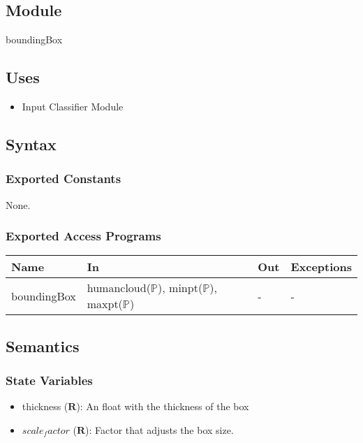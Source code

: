 \documentclass[12pt, titlepage]{article}
\begin{document}
\subsection{Module}

boundingBox

\subsection{Uses}

\begin{itemize}
  \item Input Classifier Module
\end{itemize}

\subsection{Syntax}

\subsubsection{Exported Constants}

None.

\subsubsection{Exported Access Programs}

\begin{center}
\begin{tabular}{p{2cm} p{4cm} p{2cm} p{2cm}}
\hline
\textbf{Name} & \textbf{In} & \textbf{Out} & \textbf{Exceptions} \\
\hline
boundingBox & humancloud($\mathbb{P}$),
              minpt($\mathbb{P}$),
              maxpt($\mathbb{P}$) & - & - \\
\hline
\end{tabular}
\end{center}

\subsection{Semantics}

\subsubsection{State Variables}

\begin{itemize}
  \item thickness ($\mathbf{R}$): An float with the thickness of the box
  \item $scale_factor$ ($\mathbf{R}$): Factor that adjusts the box size.
\end{itemize}
\end{document}
